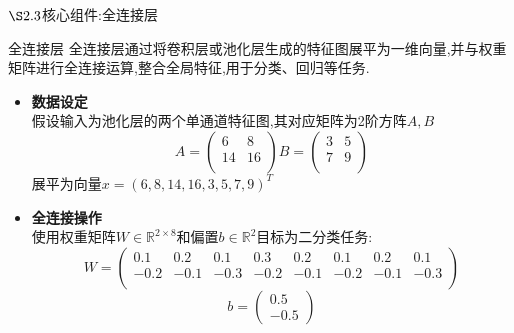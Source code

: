 \documentclass{beamer}
\begin{document}
\begin{frame}{$\S2.3$核心组件:全连接层}
    \begin{block}{全连接层}
        全连接层通过将卷积层或池化层生成的特征图展平为一维向量,并与权重矩阵进行全连接运算,整合全局特征,用于分类、回归等任务.
    \end{block}
    \begin{itemize}
        \item \textbf{数据设定}
        \\假设输入为池化层的两个单通道特征图,其对应矩阵为2阶方阵$A,B$
        \[
            A=\begin{pmatrix}
                6&8\\
                14&16\\
            \end{pmatrix}
            B=\begin{pmatrix}
                3&5\\
                7&9\\
            \end{pmatrix}
        \]
        展平为向量$x=(6,8,14,16,3,5,7,9)^T$
        \item \textbf{全连接操作}
        \\使用权重矩阵$W\in\mathbb{R}^{2\times 8}$和偏置$b\in\mathbb{R}^2$目标为二分类任务:
        \[
            W=\begin{pmatrix}
            0.1&0.2&0.1&0.3&0.2&0.1&0.2&0.1 \\
            -0.2&-0.1&-0.3&-0.2&-0.1&-0.2&-0.1&-0.3\\
            \end{pmatrix}
        \]
        \[
            b=\begin{pmatrix}
                0.5\\
                -0.5
            \end{pmatrix}\]
    \end{itemize}
\end{frame}
\end{document}
